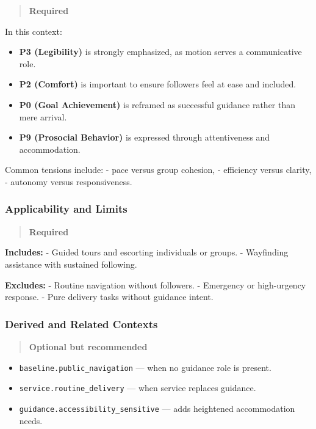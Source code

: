 \documentclass[utf8]{frontiers_suppmat} %
\providecommand{\tightlist}{%
  \setlength{\itemsep}{0pt}\setlength{\parskip}{0pt}}
\begin{document}
\begin{quote}
\textbf{Required}
\end{quote}

In this context:

\begin{itemize}
\tightlist
\item
  \textbf{P3 (Legibility)} is strongly emphasized, as motion serves a
  communicative role.
\item
  \textbf{P2 (Comfort)} is important to ensure followers feel at ease
  and included.
\item
  \textbf{P0 (Goal Achievement)} is reframed as successful guidance
  rather than mere arrival.
\item
  \textbf{P9 (Prosocial Behavior)} is expressed through attentiveness
  and accommodation.
\end{itemize}

Common tensions include: - pace versus group cohesion, - efficiency
versus clarity, - autonomy versus responsiveness.

\subsubsection{Applicability and Limits}\label{applicability-and-limits}

\begin{quote}
\textbf{Required}
\end{quote}

\textbf{Includes:} - Guided tours and escorting individuals or groups. -
Wayfinding assistance with sustained following.

\textbf{Excludes:} - Routine navigation without followers. - Emergency
or high-urgency response. - Pure delivery tasks without guidance intent.

\subsubsection{Derived and Related
Contexts}\label{derived-and-related-contexts}

\begin{quote}
\textbf{Optional but recommended}
\end{quote}

\begin{itemize}
\tightlist
\item
  \texttt{baseline.public\_navigation} --- when no guidance role is
  present.
\item
  \texttt{service.routine\_delivery} --- when service replaces guidance.
\item
  \texttt{guidance.accessibility\_sensitive} --- adds heightened
  accommodation needs.
\end{itemize}
\end{document}
